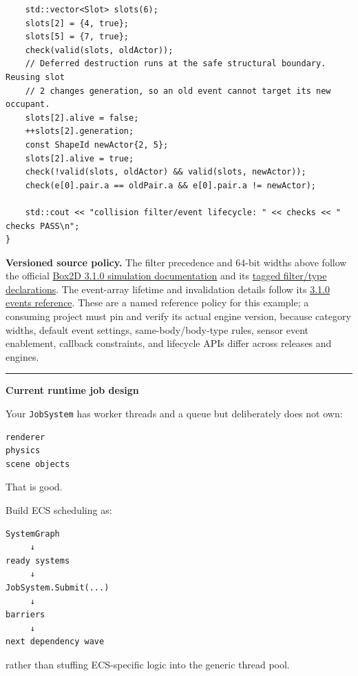 \begin{verbatim}
    std::vector<Slot> slots(6);
    slots[2] = {4, true};
    slots[5] = {7, true};
    check(valid(slots, oldActor));
    // Deferred destruction runs at the safe structural boundary. Reusing slot
    // 2 changes generation, so an old event cannot target its new occupant.
    slots[2].alive = false;
    ++slots[2].generation;
    const ShapeId newActor{2, 5};
    slots[2].alive = true;
    check(!valid(slots, oldActor) && valid(slots, newActor));
    check(e[0].pair.a == oldPair.a && e[0].pair.a != newActor);

    std::cout << "collision filter/event lifecycle: " << checks << " checks PASS\n";
}
\end{verbatim}

\textbf{Versioned source policy.} The filter precedence and 64-bit widths above follow the official \href{https://raw.githubusercontent.com/erincatto/box2d/v3.1.0/docs/simulation.md}{Box2D 3.1.0 simulation documentation} and its \href{https://raw.githubusercontent.com/erincatto/box2d/v3.1.0/include/box2d/types.h}{tagged filter/type declarations}. The event-array lifetime and invalidation details follow its \href{https://raw.githubusercontent.com/erincatto/box2d/v3.1.0/include/box2d/box2d.h}{3.1.0 events reference}. These are a named reference policy for this example; a consuming project must pin and verify its actual engine version, because category widths, default event settings, same-body/body-type rules, sensor event enablement, callback constraints, and lifecycle APIs differ across releases and engines.

\begin{center}\rule{0.5\linewidth}{0.5pt}\end{center}

\textbf{Current runtime job design}

Your \texttt{JobSystem} has worker threads and a queue but deliberately does not own:

\begin{verbatim}
renderer
physics
scene objects
\end{verbatim}

That is good.

Build ECS scheduling as:

\begin{verbatim}
SystemGraph
     ↓
ready systems
     ↓
JobSystem.Submit(...)
     ↓
barriers
     ↓
next dependency wave
\end{verbatim}

rather than stuffing ECS-specific logic into the generic thread pool.

